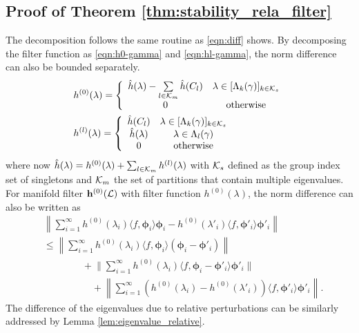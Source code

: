 \subsection{Proof of Theorem \ref{thm:stability_rela_filter}}
\label{app:stability_rela_filter}
The decomposition follows the same routine as \eqref{eqn:diff} shows. 
By decomposing the filter function as \eqref{eqn:h0-gamma} and \eqref{eqn:hl-gamma}, the norm difference can also be bounded separately. 
\begin{align}
\label{eqn:h0-gamma}& h^{(0)}(\lambda) = \left\{ 
\begin{array}{cc} 
                \hat{h}(\lambda)-\sum\limits_{l\in{\ensuremath{\mathcal K}}_m}\hat{h}(C_l)  &  \lambda\in[\Lambda_k(\gamma)]_{k\in{\ensuremath{\mathcal K}}_s} \\
                0& \text{otherwise}  \\
                \end{array} \right.  \\
\label{eqn:hl-gamma}& h^{(l)}(\lambda) = \left\{ 
\begin{array}{cc} 
                \hat{h}(C_l) &  \lambda\in[\Lambda_k(\gamma)]_{k\in{\ensuremath{\mathcal K}}_s} \\
                \hat{h}(\lambda) & 
                \lambda\in\Lambda_l(\gamma)\\
                0 &
                \text{otherwise}  \\
                \end{array} \right.             
\end{align}
where now $\hat{h}(\lambda)=h^{(0)}(\lambda)+\sum_{l\in{\ensuremath{\mathcal K}}_m}h^{(l)}(\lambda)$ with ${\mathcal K}_s$ defined as the group index set of singletons and ${\mathcal K}_m$ the set of partitions that contain multiple eigenvalues. For manifold filter ${\mathbf h}^{(0)}({\mathcal L})$ with filter function $h^{(0)}(\lambda)$, the norm difference can also be written as
\begin{align}
 \label{eqn:rela-h0}  & \nonumber \left\| \sum_{i=1}^\infty h^{(0)}(\lambda_{i}) \langle f, \bm\phi_i \rangle \bm\phi_i  -  h^{(0)}(\lambda'_i )  \langle f, \bm\phi'_i \rangle \bm\phi'_i \right\| \\
  & \nonumber \leq \left\| \sum_{i=1}^\infty h^{(0)}(\lambda_i )\langle f, \bm\phi_i \rangle (\bm\phi_i - \bm\phi'_i ) \right\| \\ \nonumber&\qquad\qquad  + \Bigg\|  \sum_{i =1}^\infty  h^{(0)}(\lambda_i )\langle f, \bm\phi_i - \bm\phi'_i  \rangle \bm\phi'_i \Bigg\|\\& \qquad\qquad \quad+ \left\|\sum_{i=1}^\infty  (h^{(0)}(\lambda_i ) -h^{(0)}(\lambda'_i) ) \langle f, \bm\phi'_i \rangle \bm\phi'_i  \right\| . 
\end{align}
The difference of the eigenvalues due to relative perturbations can be similarly addressed by Lemma \ref{lem:eigenvalue_relative}.


